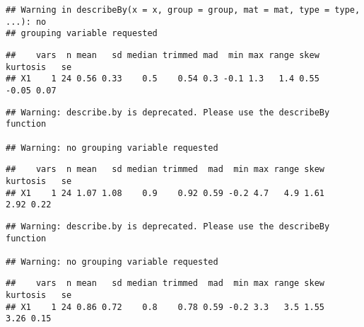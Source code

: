 \documentclass[
]{article}
\newenvironment{Shaded}{\begin{snugshade}}{\end{snugshade}}
\newcommand{\KeywordTok}[1]{\textcolor[rgb]{0.13,0.29,0.53}{\textbf{#1}}}
\newcommand{\NormalTok}[1]{#1}
\newcommand{\OperatorTok}[1]{\textcolor[rgb]{0.81,0.36,0.00}{\textbf{#1}}}
\begin{document}
\begin{verbatim}
## Warning in describeBy(x = x, group = group, mat = mat, type = type, ...): no
## grouping variable requested
\end{verbatim}

\begin{verbatim}
##    vars  n mean   sd median trimmed mad  min max range skew kurtosis   se
## X1    1 24 0.56 0.33    0.5    0.54 0.3 -0.1 1.3   1.4 0.55    -0.05 0.07
\end{verbatim}

\begin{Shaded}
\end{Shaded}

\begin{verbatim}
## Warning: describe.by is deprecated. Please use the describeBy function

## Warning: no grouping variable requested
\end{verbatim}

\begin{verbatim}
##    vars  n mean   sd median trimmed  mad  min max range skew kurtosis   se
## X1    1 24 1.07 1.08    0.9    0.92 0.59 -0.2 4.7   4.9 1.61     2.92 0.22
\end{verbatim}

\begin{Shaded}
\end{Shaded}

\begin{verbatim}
## Warning: describe.by is deprecated. Please use the describeBy function

## Warning: no grouping variable requested
\end{verbatim}

\begin{verbatim}
##    vars  n mean   sd median trimmed  mad  min max range skew kurtosis   se
## X1    1 24 0.86 0.72    0.8    0.78 0.59 -0.2 3.3   3.5 1.55     3.26 0.15
\end{verbatim}
\end{document}
